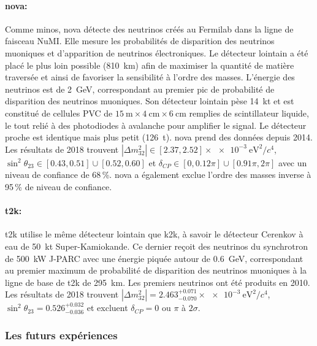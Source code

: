         \paragraph{\texorpdfstring{\gls{nova}}{NOVA}\cite{Acero2018}:} Comme \gls{minos}, \gls{nova} détecte des neutrinos créés au Fermilab dans la ligne de faisceau NuMI. Elle mesure les probabilités de disparition des neutrinos muoniques et d'apparition de neutrinos électroniques. Le détecteur lointain a été placé le plus loin possible (\SI{810}{\kilo\meter}) afin de maximiser la quantité de matière traversée et ainsi de favoriser la sensibilité à l'ordre des masses. L'énergie des neutrinos est de \SI{2}{\giga\electronvolt}, correspondant au premier pic de probabilité de disparition des neutrinos muoniques. Son détecteur lointain pèse \SI{14}{\kilo\tonne} et est constitué de  cellules PVC de $\SI{15}{\meter}\times\SI{4}{\centi\meter}\times\SI{6}{\centi\meter}$ remplies de scintillateur liquide, le tout relié à des photodiodes à avalanche pour amplifier le signal. Le détecteur proche est identique mais plus petit (\SI{126}{\tonne}). \gls{nova} prend des données depuis 2014. Les résultats de 2018\cite{Acero2018} trouvent $|\Delta m_{32}^2|\in[2.37, 2.52]\times\SI{e-3}{\electronvolt\squared\per c^4}$, $\sin^2{\theta_{23}}\in [0.43, 0.51]\cup[0.52, 0.60]$ et $\delta_{CP}\in[0, 0.12\pi]\cup[0.91\pi, 2\pi]$ avec un niveau de confiance de 68\,\%. \gls{nova} a également exclue l'ordre des masses inverse à 95\,\% de niveau de confiance.
        
        \paragraph{\gls{t2k}\cite{Abe2018}:} \gls{t2k} utilise le même détecteur lointain que \gls{k2k}, à savoir le détecteur Cerenkov à eau de \SI{50}{\kilo\tonne} Super-Kamiokande. Ce dernier reçoit des neutrinos du synchrotron de \SI{500}{\kilo\watt} J-PARC avec une énergie piquée autour de \SI{0.6}{\giga\electronvolt}, correspondant au premier maximum de probabilité de disparition des neutrinos muoniques à la ligne de base de \gls{t2k} de \SI{295}{\kilo\meter}. Les premiers neutrinos ont été produits en 2010. Les résultats de 2018\cite{Abe2018} trouvent $|\Delta m_{32}^2|=2.463^{+0.071}_{-0.070}\times\SI{e-3}{\electronvolt\squared\per c^4}$, $\sin^2{\theta_{23}}=0.526^{+0.032}_{-0.036}$ et excluent $\delta_{CP}=0$ ou $\pi$ à $2\sigma$.

      \subsubsection{Les futurs expériences}

